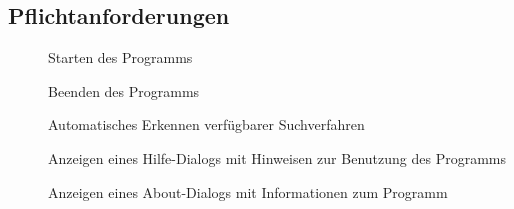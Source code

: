 \subsection{Pflichtanforderungen}
\begin{description}
	\item[] Starten des Programms
	\item[] Beenden des Programms
	\item[] Automatisches Erkennen verfügbarer Suchverfahren
	\item[] Anzeigen eines Hilfe-Dialogs mit Hinweisen zur Benutzung des Programms
	\item[] Anzeigen eines About-Dialogs mit Informationen zum Programm
	\newline
 

\end{description}
